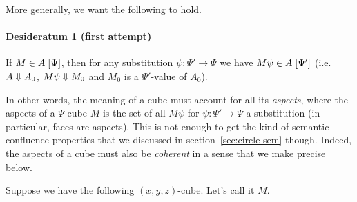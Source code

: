 \documentclass{article}
\newcommand\Base{\mathsf{base}}
\newcommand\Loop{\mathsf{loop}}
\begin{document}
\begin{center}
\end{center}

More generally, we want the following to hold.

\paragraph{Desideratum 1 (first attempt)} 
If $M \in A \; [\Psi]$, then for any substitution
$\psi : \Psi' \to \Psi$ we have $M \psi \in A \; [\Psi']$
(i.e. $A \mathrel{\Downarrow} A_0$, $M \psi \mathrel{\Downarrow} M_0$ and $M_0$ is a
$\Psi'$-value of $A_0$).

\bigskip

In other words, the meaning of a cube must account for all its
\emph{aspects}, where the aspects of a $\Psi$-cube $M$ is the set of
all $M\psi$ for $\psi : \Psi' \to \Psi$ a substitution (in particular,
faces are aspects). This is not enough to get the kind of semantic
confluence properties that we discussed in
section~\ref{sec:circle-sem} though. Indeed, the aspects of a cube must
also be \emph{coherent} in a sense that we make precise below.

Suppose we have the following $(x,y,z)$-cube. Let's call it $M$.
\end{document}
